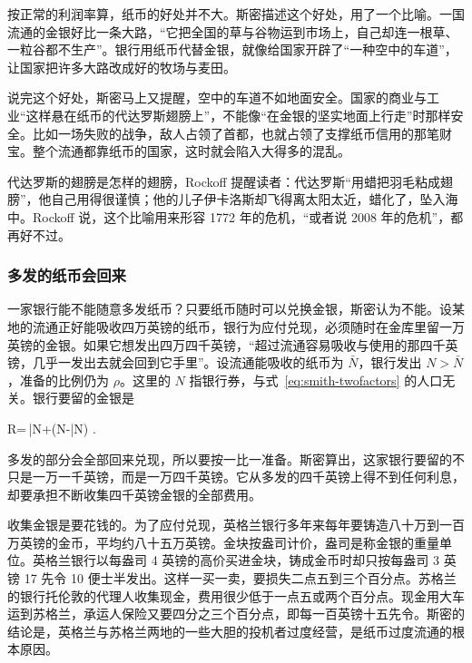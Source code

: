 按正常的利润率算，纸币的好处并不大。斯密描述这个好处，用了一个比喻。一国流通的金银好比一条大路，“它把全国的草与谷物运到市场上，自己却连一根草、一粒谷都不生产”。银行用纸币代替金银，就像给国家开辟了“一种空中的车道”，让国家把许多大路改成好的牧场与麦田\cite{smith1776}。

说完这个好处，斯密马上又提醒，空中的车道不如地面安全。国家的商业与工业“这样悬在纸币的代达罗斯翅膀上”，不能像“在金银的坚实地面上行走”时那样安全。比如一场失败的战争，敌人占领了首都，也就占领了支撑纸币信用的那笔财宝。整个流通都靠纸币的国家，这时就会陷入大得多的混乱\cite{smith1776}。

\begin{intuition}[代达罗斯的翅膀]
代达罗斯的翅膀是怎样的翅膀，Rockoff 提醒读者：代达罗斯“用蜡把羽毛粘成翅膀”，他自己用得很谨慎；他的儿子伊卡洛斯却飞得离太阳太近，蜡化了，坠入海中\cite{rockoff2009}。Rockoff 说，这个比喻用来形容 1772 年的危机，“或者说 2008 年的危机”，都再好不过\cite{rockoff2009}。
\end{intuition}

\subsubsection{多发的纸币会回来}
一家银行能不能随意多发纸币？只要纸币随时可以兑换金银，斯密认为不能。设某地的流通正好能吸收四万英镑的纸币，银行为应付兑现，必须随时在金库里留一万英镑的金银。如果它想发出四万四千英镑，“超过流通容易吸收与使用的那四千英镑，几乎一发出去就会回到它手里”\cite{smith1776}。设流通能吸收的纸币为 $\bar N$，银行发出 $N>\bar N$，准备的比例仍为 $\rho$。这里的 $N$ 指银行券，与式~\eqref{eq:smith-twofactors} 的人口无关。银行要留的金银是
\begin{keyeq}
R=\rho\,\bar N+(N-\bar N) .\label{eq:smith-reflux}
\end{keyeq}
多发的部分会全部回来兑现，所以要按一比一准备。斯密算出，这家银行要留的不只是一万一千英镑，而是一万四千英镑。它从多发的四千英镑上得不到任何利息，却要承担不断收集四千英镑金银的全部费用\cite{smith1776}。

收集金银是要花钱的。为了应付兑现，英格兰银行多年来每年要铸造八十万到一百万英镑的金币，平均约八十五万英镑。金块按盎司计价，盎司是称金银的重量单位。英格兰银行以每盎司 4 英镑的高价买进金块，铸成金币时却只按每盎司 3 英镑 17 先令 10 便士半发出。这样一买一卖，要损失二点五到三个百分点\cite{smith1776}。苏格兰的银行托伦敦的代理人收集现金，费用很少低于一点五或两个百分点。现金用大车运到苏格兰，承运人保险又要四分之三个百分点，即每一百英镑十五先令\cite{smith1776}。斯密的结论是，英格兰与苏格兰两地的一些大胆的投机者过度经营，是纸币过度流通的根本原因\cite{smith1776}。


